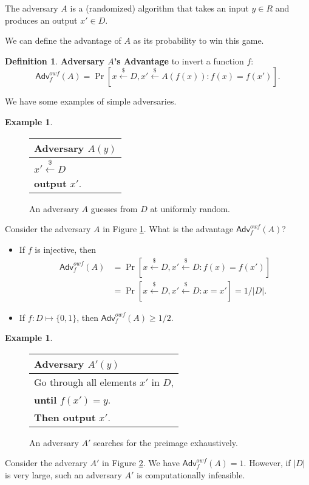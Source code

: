 \documentclass[12pt]{article}
\newcommand{\bits}{\{0,1\}}
\newcommand{\getsr}{\stackrel{\$}{\gets}}
\newcommand{\Adv}{\textsf{Adv}}
\theoremstyle{definition}
\newtheorem{definition}[theorem]{Definition}
\newtheorem{example}[theorem]{Example}
\begin{document}
The adversary $A$ is a (randomized) algorithm that takes an input $y\in R$ and produces an output $x'\in D$.

We can define the advantage of $A$ as its probability to win this game.
\begin{definition}
{\bf Adversary $A$'s Advantage} to invert a function $f$:
$$\Adv_f^{owf}(A) = \Pr [x\getsr D, x'\getsr A(f(x)) : f(x)=f(x')].$$
\end{definition}

We have some examples of simple adversaries.
\begin{example}
\begin{figure}[!h]
\centering
\begin{tabular}{l}
Adversary $A(y)$\\
\hline
$x' \getsr D$\\
{\bf output} $x'$.\\
\end{tabular}
\caption{An adversary $A$ guesses from $D$ at uniformly random.}
\label{fig:rg}
\end{figure}

Consider the adversary $A$ in Figure \ref{fig:rg}. What is the advantage $\Adv_f^{owf}(A)$?
\begin{itemize}
\item If $f$ is injective, then
$$
\begin{aligned}
\Adv_f^{owf}(A) &= \Pr [x\getsr D, x'\getsr D : f(x) = f(x')] \\
&= \Pr [x\getsr D, x'\getsr D : x = x'] = 1/|D|.
\end{aligned}$$

\item If $f : D \mapsto \bits$, then $\Adv_f^{owf}(A) \geq 1/2$.
\end{itemize}
\end{example}

\begin{example}
\begin{figure}[!h]
\centering
\begin{tabular}{l}
Adversary $A'(y)$\\
\hline
Go through all elements $x'$ in $D$, \\
{\bf until} $f(x')=y$. \\
{\bf Then output} $x'$.\\
\end{tabular}
\caption{An adversary $A'$ searches for the preimage exhaustively.}
\label{fig:bf}
\end{figure}

Consider the adverary $A'$ in Figure \ref{fig:bf}. We have $\Adv_f^{owf}(A) = 1$. However, if $|D|$ is very large, such an adversary $A'$ is computationally infeasible.
\end{example}
\end{document}
